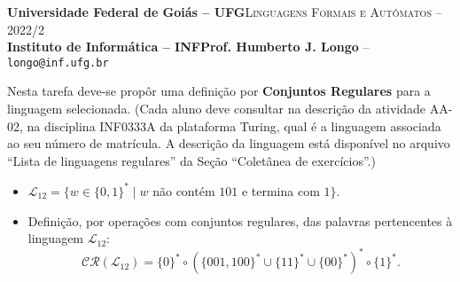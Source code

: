 \documentclass[12pt]{article}
\def\discente{Rafael Nunes Moreira Costa}
\def\matricula{202107855}
\def\ua{02}
\def\myling{{12}} %
\newcommand{\concatL}{\ensuremath{{\scriptstyle\circ}}}%
\begin{document}
 \begin{tcolorbox}[rounded corners, colback=blue!3, colframe=blue!40!black]
  \footnotesize\textbf{Universidade Federal de Goiás -- UFG}\hfill \textsc{Linguagens Formais e Autômatos -- 2022/2}\\
  \footnotesize\textbf{Instituto de Informática -- INF\hfill Prof. Humberto J. Longo} -- \scriptsize\texttt{longo@inf.ufg.br}
 \end{tcolorbox}\bigskip
%
\begin{tcolorbox}[rounded corners, colback=blue!2, colframe=blue!40!black, title=\textbf{Atividade AA-\ua}]
   Nesta tarefa deve-se propôr uma definição por \textbf{Conjuntos Regulares} para a linguagem selecionada. (Cada aluno deve consultar na descrição da atividade AA-\ua, na disciplina INF0333A da plataforma Turing, qual é a linguagem associada ao seu número de matrícula. A descrição da linguagem está disponível no arquivo ``Lista de linguagens regulares'' da Seção ``Coletânea de exercícios''.)
\end{tcolorbox}\bigskip
%
%
\begin{tcolorbox}[rounded corners, colback=yellow!5, colframe=red!40!black, title=\textbf{\matricula\ -- \discente}]
 \begin{itemize}[leftmargin=*]
  \item $\mathcal{L}_\myling = \{w\in\{0,1\}^*\mid w$ não contém $101$ e termina com $1\}$.
%
  \item Definição, por operações com conjuntos regulares, das palavras pertencentes à linguagem $\mathcal{L}_\myling$:
   $$\mathcal{CR}(\mathcal{L}_\myling) =
    \{0\}^*\concatL(\{001, 100\}^*\cup\{11\}^*\cup \{00\}^*)^*\concatL\{1\}^*
   .$$
 \end{itemize}
\end{tcolorbox}
%
%
\end{document}
